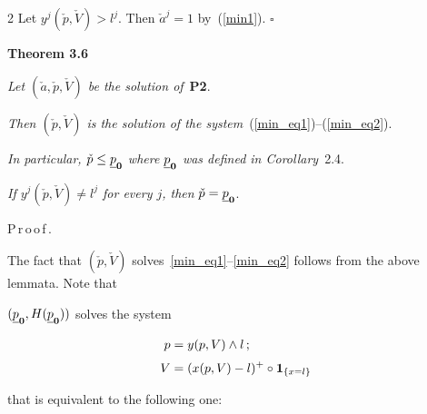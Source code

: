 \begin{multicols}{2}
Let  $y^j(\check  p,\check  V) > l^j$. Then $\check a^j = 1$ by~(\ref{min1}). \hfill$\square$





\smallskip



\noindent

\textbf{Theorem 3.6}\

\textit{Let $(\check a, \check p, \check V)$ be the solution of}~\textbf{P2}. 

\textit{Then $(\check p, \check V)$ is the solution of the system}~(\ref{min_eq1})--(\ref{min_eq2}). 

\textit{In particular, $\check p \leq \underline p_{\bf 0}$ where $\underline p_{\bf 0}$ was defined in Corollary}~2.4. 

\textit{If $y^j(\check p, \check V) \neq l^j$ for every $j$, then} $\check p =\underline p_{\bf 0}$.



\smallskip



\noindent

P\,r\,o\,o\,f\,.\ \

The fact that $(\check p, \check V)$ solves~\eqref{min_eq1}--\eqref{min_eq2} follows from the above lemmata. Note that 

$(\underline p_{\bf 0}, H(\underline p_{\bf 0}))$ solves the system



\vspace*{-4pt}



\noindent

\begin{align*}

p &= y(p, V) \wedge l\,; \\[3pt]

V &= (x(p, V) - l)^+ \circ {\bf 1}_{\{x=l\}}

\end{align*}



\vspace*{-4pt}



\noindent

that  is equivalent to the following one:



\vspace*{-4pt}




\end{multicols}
